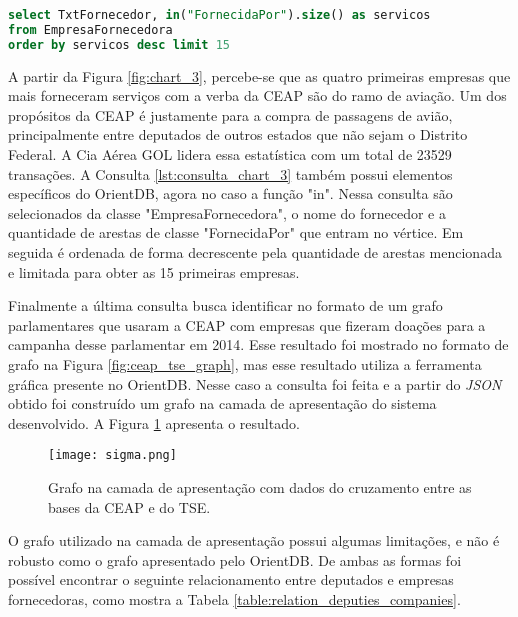 \begin{lstlisting}[label={lst:consulta_chart_3}, caption={Consulta para a Figura \ref{fig:chart_3}},captionpos=b, language=sql]
select TxtFornecedor, in("FornecidaPor").size() as servicos 
from EmpresaFornecedora 
order by servicos desc limit 15
\end{lstlisting}

A partir da Figura \ref{fig:chart_3}, percebe-se que as quatro primeiras empresas que mais forneceram serviços com a verba da CEAP são do ramo de aviação. Um dos propósitos da CEAP é justamente para a compra de passagens de avião, principalmente entre deputados de outros estados que não sejam o Distrito Federal. A Cia Aérea GOL lidera essa estatística com um total de 23529 transações. A Consulta \ref{lst:consulta_chart_3} também possui elementos específicos do OrientDB, agora no caso a função "in". Nessa consulta são selecionados da classe "EmpresaFornecedora", o nome do fornecedor e a quantidade de arestas de classe "FornecidaPor"  que entram no vértice. Em seguida é ordenada de forma decrescente pela quantidade de arestas mencionada e limitada para obter as 15 primeiras empresas.

Finalmente a última consulta busca identificar no formato de um grafo parlamentares que usaram a CEAP com empresas que fizeram doações para a campanha desse parlamentar em 2014. Esse resultado foi mostrado no formato de grafo na Figura \ref{fig:ceap_tse_graph}, mas esse resultado utiliza a ferramenta gráfica presente no OrientDB. Nesse caso a consulta foi feita e a partir do \textit{JSON} obtido foi construído um grafo na camada de apresentação do sistema desenvolvido. A Figura \ref{fig:sigma} apresenta o resultado.

\begin{figure}[H]
\centering
\texttt{[image: sigma.png]}
\caption{Grafo na camada de apresentação com dados do cruzamento entre as bases da CEAP e do TSE.}
\label{fig:sigma}
\end{figure}

O grafo utilizado na camada de apresentação possui algumas limitações, e não é robusto como o grafo apresentado pelo OrientDB. De ambas as formas foi possível encontrar o seguinte relacionamento entre deputados e empresas fornecedoras, como mostra a Tabela \ref{table:relation_deputies_companies}.

